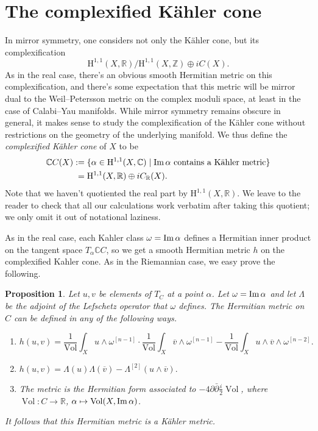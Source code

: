 \documentclass[11pt,a4paper]{amsart}
\newtheorem{prop}[theo]{Proposition}
\theoremstyle{definition}
\theoremstyle{remark}
\newcommand{\RR}{\mathbb{R}}
\newcommand{\ZZ}{\mathbb{Z}}
\newcommand{\CC}{\mathbb{C}}
\newcommand{\Vol}{\mathop{\mathrm{Vol}}}
\def\Im{\mathop{\rm Im}}
\def\ov#1{\overline{#1}}
\def\d{\partial}
\def\dbar{\bar\partial}
\def\coho#1{\mathrm{H}^{#1}}
\def\q#1{\frac{1}{\Vol}\int_X #1 \wedge \kf\^{n-1}}
\def\qq#1#2{\frac{1}{\Vol}\int_X #1 \wedge #2 \wedge \kf\^{n-2}}
\def\kf{\omega}
\def\ckf{\alpha}
\def\Lef{\Lambda}
\def\ton{u}
\def\ttw{v}
\def\^#1{^{[#1]}}
\def\KC{C}
\def\CKC{\mathbb{C}C}
\begin{document}
\section{The complexified K\"{a}hler cone}


In mirror symmetry, one considers not only the K\"{a}hler cone, but its
complexification
$$
\coho{1,1}(X,\RR)/\coho{1,1}(X,\ZZ) \oplus i\KC(X).
$$
As in the real case, there's an obvious smooth Hermitian metric on this
complexification, and there's some expectation that this metric will be
mirror dual to the Weil--Petersson metric on the complex moduli space,
at least in the case of Calabi--Yau manifolds. While mirror symmetry
remains obscure in general, it makes sense to study the complexification
of the K\"{a}hler cone without restrictions on the geometry of the
underlying manifold. We thus define the \emph{complexified K\"{a}hler
cone} of $X$ to be
\begin{align*}
\CKC(X) 
&:=
\{ \ckf \in \coho{1,1}(X,\CC) 
\mid
\text{$\Im\ckf$ contains a K\"{a}hler metric}
\}
\\
&\phantom{:}= \coho{1,1}(X,\RR) \oplus i C_{\RR}(X).
\end{align*}
Note that we haven't quotiented the real part by $\coho{1,1}(X,\RR)$.
We leave to the reader to check that all our calculations work verbatim
after taking this quotient; we only omit it out of notational laziness. 


As in the real case, each Kahler class $\kf = \Im \ckf$ defines a
Hermitian inner product on the tangent space $T_{\ckf} \CKC$, so we get
a smooth Hermitian metric $h$ on the complexified Kahler cone. As in the
Riemannian case, we easy prove the following.


\begin{prop}
Let $\ton,\ttw$ be elements of $T_C$ at a point $\ckf$. Let $\kf =
\Im\ckf$ and let $\Lef$ be the adjoint of the Lefschetz operator that
$\kf$ defines.  The Hermitian metric on $C$ can be defined in any of the
following ways.
\begin{enumerate}
    \item 
$$
h(\ton, \ttw)
= \q{\ton} \cdot \q{\ov{\ttw}}
- \qq{\ton}{\ov\ttw}.
$$
    \item
\hfil
$
h(\ton,\ttw)
= \Lef(\ton)\Lef(\ov\ttw)
- \Lef\^2(\ton\wedge\ov\ttw).
$
\hfil
    \item
The metric is the Hermitian form associated to 
$-4\d\dbar\frac{i}{2}\Vol$, where $\Vol : C \to \RR$, $\ckf \mapsto
\Vol(X,\Im\ckf)$.
\end{enumerate}
It follows that this Hermitian metric is a K\"{a}hler metric.
\end{prop}
\end{document}
